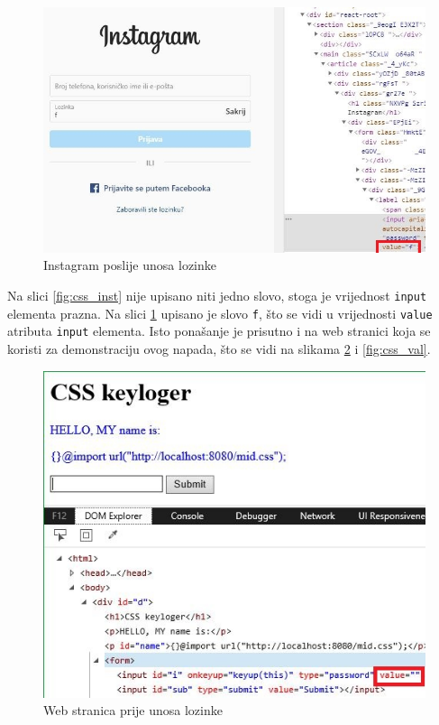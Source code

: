 \documentclass[12pt, oneside, onecolumn]{book}
\begin{document}
{\begin{figure}[H]
	\begin{center}
		\includegraphics[width=\textwidth]{css_inst2.jpg}
		\caption{Instagram poslije unosa lozinke} \label{fig:css_inst2}
	\end{center}
\end{figure}

Na slici \ref{fig:css_inst} nije upisano niti jedno slovo, stoga je vrijednost \texttt{input} elementa prazna. Na slici \ref{fig:css_inst2} upisano je slovo \texttt{f}, što se vidi u vrijednosti \texttt{value} atributa \texttt{input} elementa. Isto ponašanje je prisutno i na web stranici koja se koristi za demonstraciju ovog napada, što se vidi na slikama \ref{fig:css_nval} i \ref{fig:css_val}.

\begin{figure}[H]
	\begin{center}
		\includegraphics[width=\textwidth]{css_nval.jpg}
		\caption{Web stranica prije unosa lozinke} \label{fig:css_nval}
	\end{center}
\end{figure}

}
\end{document}
